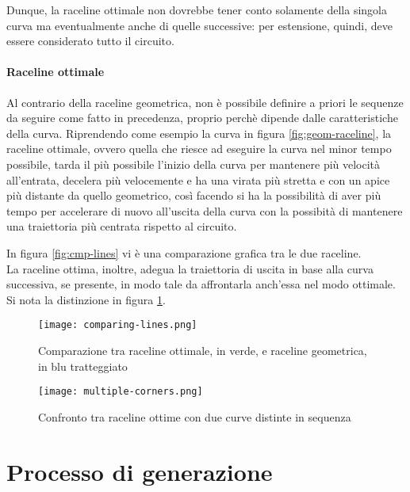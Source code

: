 Dunque, la raceline ottimale non dovrebbe tener conto solamente della singola curva ma eventualmente
anche di quelle successive: per estensione, quindi, deve essere considerato tutto il circuito.

\paragraph{Raceline ottimale}
Al contrario della raceline geometrica, non è possibile definire a priori le sequenze da seguire come
fatto in precedenza, proprio perchè dipende dalle caratteristiche della curva.
Riprendendo come esempio la curva in figura \ref{fig:geom-raceline}, la raceline ottimale, ovvero quella
che riesce ad eseguire la curva nel minor tempo possibile, tarda il più possibile l'inizio della curva
per mantenere più velocità all'entrata, decelera più velocemente e ha una virata più stretta e con un
apice più distante da quello geometrico, così facendo si ha la possibilità di aver più tempo per
accelerare di nuovo all'uscita della curva con la possibità di mantenere una traiettoria più centrata
rispetto al circuito.

In figura \ref{fig:cmp-lines} vi è una comparazione grafica tra le due raceline.\\
La raceline ottima, inoltre, adegua la traiettoria di uscita in base alla curva successiva, se presente,
in modo tale da affrontarla anch'essa nel modo ottimale. Si nota la distinzione in figura
\ref{fig:cmp-opt-lines}.

\begin{figure}[H]
	\begin{minipage}[c]{0.45\textwidth}
		\texttt{[image: comparing-lines.png]}
		\caption{Comparazione tra raceline ottimale, in verde, e raceline geometrica, in blu tratteggiato}\label{fig:cmp-lines}
	\end{minipage}\hfill
	\begin{minipage}[c]{0.45\textwidth}
		\texttt{[image: multiple-corners.png]}
		\caption{Confronto tra raceline ottime con due curve distinte in sequenza}\label{fig:cmp-opt-lines}
	\end{minipage}
\end{figure}


\section{Processo di generazione}

